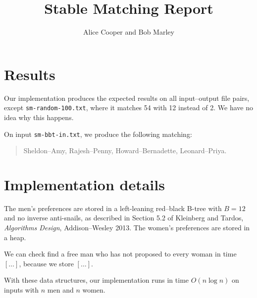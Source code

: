\documentclass{article}
\title{Stable Matching Report}
\author{Alice Cooper and Bob Marley}
\begin{document}
  \maketitle

  \section{Results}

  Our implementation produces the expected results on all input--output file pairs, except {\tt sm-random-100.txt}, where it matches 54 with 12 instead of 2.
  We have no idea why this happens.%

  On input {\tt sm-bbt-in.txt}, we produce the following matching:
  \begin{quotation}
    Sheldon--Amy, Rajesh--Penny, Howard--Bernadette, Leonard--Priya.  
  \end{quotation}

  \section{Implementation details}

  The men's preferences are stored in a left-leaning red--black B-tree with $B=12$ and no inverse anti-snails,%
   as described in Section 5.2 of Kleinberg and Tardos, \emph{Algorithms Design}, Addison--Wesley 2013.%
  The women's preferences are stored in a heap.

  We can check find a free man who has not proposed to every woman in time $[\ldots]$,
  because we store $[\ldots]$.

  With these data structures, our implementation runs in time $O(n\log n)$  
  on inputs with $n$ men and $n$ women.
\end{document}
